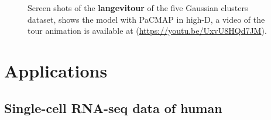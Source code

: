 \documentclass[
  12pt]{article}
\begin{document}
\begin{figure}[H]
\begin{minipage}{0.33\linewidth}
{}

\subcaption{\label{fig-gau5-sc2}}

\end{minipage}%
%
\begin{minipage}{0.33\linewidth}


\subcaption{\label{fig-gau5-sc3}}

\end{minipage}%

\caption{\label{fig-gau5-sc}Screen shots of the \textbf{langevitour} of
the five Gaussian clusters dataset, shows the model with PaCMAP in
high-D, a video of the tour animation is available at
(\url{https://youtu.be/UxvU8HQd7JM}).}

\end{figure}%

\section{Applications}\label{sec-applications}

\subsection{Single-cell RNA-seq data of
human}\label{single-cell-rna-seq-data-of-human}
\end{document}
